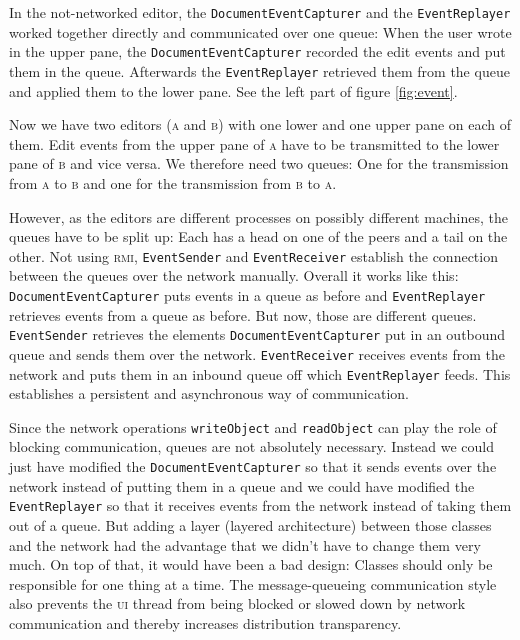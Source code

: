 \documentclass[a4paper,draft,12pt,oneside,article,table]{memoir}
\newcommand{\mil}[1]{\texttt{#1}}
\begin{document}
In the not-networked editor, the \mil{DocumentEventCapturer} and the
\mil{EventReplayer} worked together directly and communicated over one
queue: When the user wrote in the upper pane, the
\mil{DocumentEventCapturer} recorded the edit events and put them in
the queue. Afterwards the \mil{EventReplayer} retrieved them from the
queue and applied them to the lower pane. See the left part of figure \ref{fig:event}.

Now we have two editors (\textsc{a} and \textsc{b}) with one lower and
one upper pane on each of them. Edit events from the upper pane of
\textsc{a} have to be transmitted to the lower pane of \textsc{b} and
vice versa. We therefore need two queues: One for the transmission
from \textsc{a} to \textsc{b} and one for the transmission from
\textsc{b} to \textsc{a}.

However, as the editors are different processes on possibly
different machines, the queues have to be split up: Each has a head on
one of the peers and a tail on the other.  Not using \textsc{rmi},
\mil{EventSender} and \mil{EventReceiver} establish the connection
between the queues over the network manually. Overall it works like
this: \mil{DocumentEventCapturer} puts events in a queue as before and
\mil{EventReplayer} retrieves events from a queue as before. But
now, those are different queues.  \mil{EventSender} retrieves the
elements \mil{DocumentEventCapturer} put in an outbound queue and
sends them over the network.  \mil{EventReceiver} receives events from
the network and puts them in an inbound queue off which
\mil{EventReplayer} feeds. This establishes a persistent and
asynchronous way of communication.

Since the network operations \mil{writeObject} and \mil{readObject}
can play the role of blocking communication, queues are not absolutely
necessary. Instead we could just have modified the
\mil{DocumentEventCapturer} so that it sends events over the network
instead of putting them in a queue and we could have modified the
\mil{EventReplayer} so that it receives events from the network
instead of taking them out of a queue. But adding a layer (layered
architecture) between those classes and the network had the advantage
that we didn't have to change them very much.  On top of that, it
would have been a bad design: Classes should only be responsible for
one thing at a time. The message-queueing communication style also
prevents the \textsc{ui} thread from being blocked or slowed down by
network communication and thereby increases distribution transparency.
\end{document}
